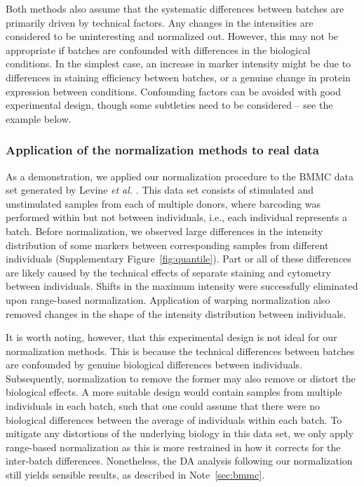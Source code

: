 \documentclass{article}
\begin{document}
Both methods also assume that the systematic differences between batches are primarily driven by technical factors.
Any changes in the intensities are considered to be uninteresting and normalized out.
However, this may not be appropriate if batches are confounded with differences in the biological conditions.
In the simplest case, an increase in marker intensity might be due to differences in staining efficiency between batches, or a genuine change in protein expression between conditions.
Confounding factors can be avoided with good experimental design, though some subtleties need to be considered -- see the example below.

\subsubsection{Application of the normalization methods to real data}
As a demonstration, we applied our normalization procedure to the BMMC data set generated by Levine \textit{et al.} \cite{levine2015datadriven}.
This data set consists of stimulated and unstimulated samples from each of multiple donors, where barcoding was performed within but not between individuals, i.e., each individual represents a batch.
Before normalization, we observed large differences in the intensity distribution of some markers between corresponding samples from different individuals (Supplementary Figure~\ref{fig:quantile}).
Part or all of these differences are likely caused by the technical effects of separate staining and cytometry between individuals.
Shifts in the maximum intensity were successfully eliminated upon range-based normalization.
Application of warping normalization also removed changes in the shape of the intensity distribution between individuals.

It is worth noting, however, that this experimental design is not ideal for our normalization methods.
This is because the technical differences between batches are confounded by genuine biological differences between individuals.
Subsequently, normalization to remove the former may also remove or distort the biological effects.
A more suitable design would contain samples from multiple individuals in each batch, such that one could assume that there were no biological differences between the average of individuals within each batch.
To mitigate any distortions of the underlying biology in this data set, we only apply range-based normalization as this is more restrained in how it corrects for the inter-batch differences.
Nonetheless, the DA analysis following our normalization still yields sensible results, as described in Note~\ref{sec:bmmc}.
\end{document}
